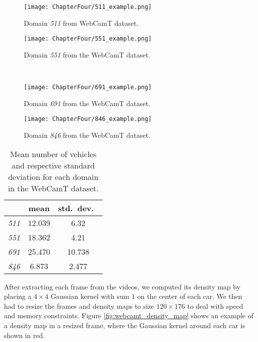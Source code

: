 \begin{figure}[!ht]
    \centering
    \begin{minipage}[b]{0.4\textwidth}
        \texttt{[image: ChapterFour/511\_example.png]}
        \caption{Domain \textit{511} from WebCamT dataset.}
        \label{fig:webcamt_511}
    \end{minipage}
    \hfill
    \begin{minipage}[b]{0.4\textwidth}
        \texttt{[image: ChapterFour/551\_example.png]}
        \caption{Domain \textit{551} from the WebCamT dataset.}
        \label{fig:webcamt_551}
    \end{minipage} \\
    \vspace{1cm}
    \begin{minipage}[b]{0.4\textwidth}
        \texttt{[image: ChapterFour/691\_example.png]}
        \caption{Domain \textit{691} from the WebCamT dataset.}
        \label{fig:webcamt_691}
    \end{minipage}
    \hfill
    \begin{minipage}[b]{0.4\textwidth}
        \texttt{[image: ChapterFour/846\_example.png]}
        \caption{Domain \textit{846} from the WebCamT dataset.}
        \label{fig:webcamt_846}
    \end{minipage}
\end{figure}

\begin{table}[!ht]
    \centering
    \begin{tabular}{c| c c}
        & mean & std.\ dev.\  \\
        \hline
        \textit{511} & 12.039 & 6.32 \\
        \textit{551} & 18.362 & 4.21 \\
        \textit{691} & 25.470 & 10.738 \\
        \textit{846} & 6.873 & 2.477 \\
    \end{tabular}
    \caption{Mean number of vehicles and respective standard deviation for each domain in the WebCamT dataset.}
    \label{tab:webcamt_domains}
\end{table}

After extracting each frame from the videos, we computed its density map by placing a $4\times4$ Gaussian kernel with sum $1$ on the center of each car. We then had to resize the frames and density maps to size $120\times 176$ to deal with speed and memory constraints. Figure \ref{fig:webcamt_density_map} shows an example of a density map in a resized frame, where the Gaussian kernel around each car is shown in red.

